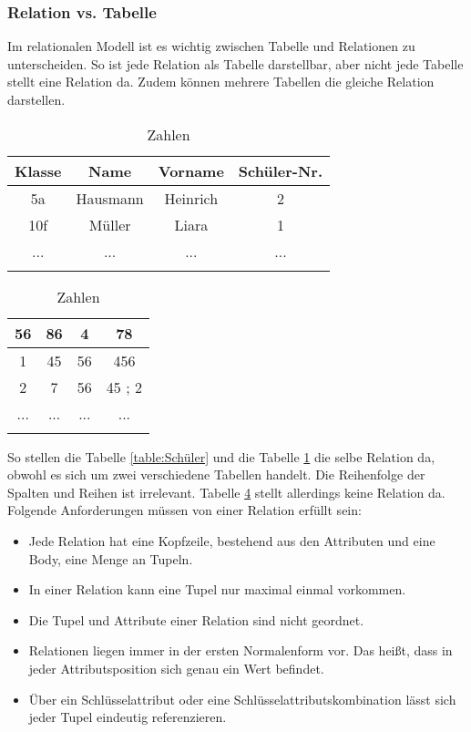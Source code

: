 \documentclass[12pt, a4paper, twoside]{article}
\begin{document}
	\subsubsection{Relation vs. Tabelle}
		Im relationalen Modell ist es wichtig zwischen Tabelle und Relationen zu unterscheiden. So ist jede Relation als Tabelle darstellbar, aber nicht jede Tabelle stellt eine Relation da. Zudem können mehrere Tabellen die gleiche Relation darstellen.
				\cite{Meier:SQLNoSQLDatenbanken}
		\begin{table}[H]
			\begin{minipage}{.5\textwidth}
				\begin{longtable}{|c|c|c|c|}
					\hline
					Klasse & Name & Vorname & Schüler-Nr.  \\
					\hline
					5a & Hausmann & Heinrich & 2 \\
					\hline
					10f  & Müller & Liara &1 \\
					\hline
					... & ... & ... & ... \\
					\hline
					\caption{SCHÜLER}
					\label{table:Schüler:flipped}
				\end{longtable}
			\end{minipage}
			\begin{minipage}{.5\textwidth}
				\begin{longtable}{|c|c|c|c|}
					\hline
					56 & 86 & 4 & 78 \\
					\hline
					1 & 45 & 56 & 456 \\
					\hline
					2 & 7 & 56 & 45 ; 2\\
					\hline
					... & ... & ... & ... \\
					\hline
					\caption{Zahlen}
					\label{table:Zahlen}
				\end{longtable}
			\end{minipage}
		\end{table}

		So stellen die Tabelle \ref{table:Schüler} und die Tabelle \ref{table:Schüler:flipped} die selbe Relation da, obwohl es sich um zwei verschiedene Tabellen handelt. Die Reihenfolge der Spalten und Reihen ist irrelevant. Tabelle \ref{table:Zahlen} stellt allerdings keine Relation da.
		\cite{darwen2009introduction}\\
		Folgende Anforderungen müssen von einer Relation erfüllt sein:
		\begin{itemize}
			\item Jede Relation hat eine Kopfzeile, bestehend aus den Attributen und eine Body, eine Menge an Tupeln.
			\item In einer Relation kann eine Tupel nur maximal einmal vorkommen.
			\item Die Tupel und Attribute einer Relation sind nicht geordnet.
			\item Relationen liegen immer in der ersten Normalenform vor. Das heißt, dass in jeder Attributsposition sich genau ein Wert befindet.
			\item Über ein Schlüsselattribut oder eine Schlüsselattributskombination lässt sich jeder Tupel eindeutig referenzieren.
		\end{itemize}
	
\end{document}
